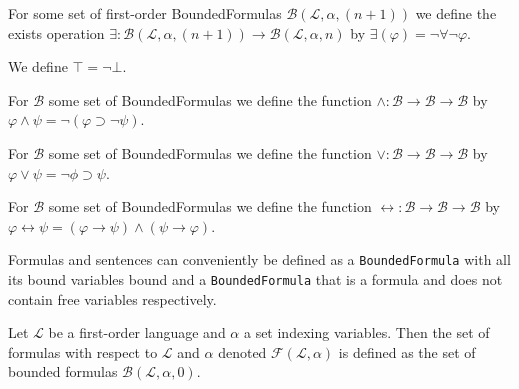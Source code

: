 \begin{definition}\label{def:FO-Ex}
  \leanok
  For some set of first-order BoundedFormulas $\mathcal{B}(\mathcal{L},\alpha,(n+1))$ we define the exists operation $\exists : \mathcal{B}(\mathcal{L},\alpha,(n + 1)) \to \mathcal{B}(\mathcal{L},\alpha,n)$ by $\exists(\varphi) = \neg \forall \neg \varphi$.
\end{definition}

\begin{definition}\label{def:Top}
  \leanok
  We define $\top = \neg \bot$.
\end{definition}

\begin{definition}\label{def:FO-And}
  \leanok
  For $\mathcal{B}$ some set of BoundedFormulas we define the function $\wedge : \mathcal{B} \to \mathcal{B} \to \mathcal{B}$ by $\varphi \wedge \psi = \neg (\varphi \supset \neg \psi)$.
\end{definition}

\begin{definition}[$\vee$ : Or]\label{def:FO-Or}
  \leanok
  For $\mathcal{B}$ some set of BoundedFormulas we define the function $\vee : \mathcal{B} \to \mathcal{B} \to \mathcal{B}$ by $\varphi \vee \psi = \neg \phi \supset \psi$.
\end{definition}

\begin{definition}\label{def:FO-Iff}
  \leanok
  For $\mathcal{B}$ some set of BoundedFormulas we define the function $\leftrightarrow : \mathcal{B} \to \mathcal{B} \to \mathcal{B}$ by $\varphi \leftrightarrow \psi = (\varphi \to \psi) \wedge (\psi \to \varphi)$.
\end{definition}

Formulas and sentences can conveniently be defined as a \texttt{BoundedFormula} with all its bound variables bound and a \texttt{BoundedFormula} that is a formula and does not contain free variables respectively.

\begin{definition}\label{def:FO-Formula}
  \leanok
    Let $\mathcal{L}$ be a first-order language and $\alpha$ a set indexing variables. Then the set of formulas with respect to $\mathcal{L}$ and $\alpha$ denoted $\mathcal{F}(\mathcal{L},\alpha)$ is defined as the set of bounded formulas $\mathcal{B}(\mathcal{L},\alpha,0)$.
\end{definition}

